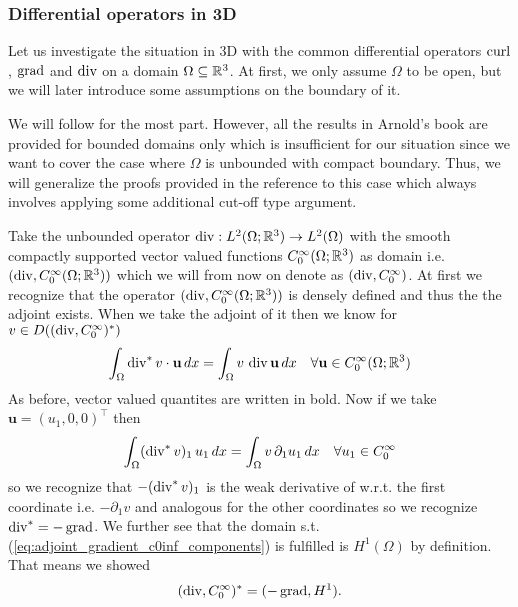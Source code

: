 \documentclass[../master_thesis.tex]{subfiles}
\begin{document}
\subsubsection{Differential operators in 3D}\label{sec:adjoints_differential_operators_3d}

Let us investigate the situation in 3D with the common differential 
operators $\operatorname{curl}$, $\operatorname{grad}$ and $\operatorname{div}$ on a domain $\Omega \subseteq \mathbb{R}^3$. 
At first, we only assume  $\Omega$ to be open, but we will later 
introduce some assumptions on the boundary of it. 


We will follow \cite[Sec.\,3.4]{arnold} for the most part. However, all the results in Arnold's book 
are provided for bounded domains only which is insufficient for our situation since 
we want to cover the case where $\Omega$ is unbounded with compact boundary. Thus, 
we will generalize the proofs provided in the reference to this case which always involves 
applying some additional cut-off type argument.

Take the unbounded operator 
$\operatorname{div}: L^2(\Omega;\mathbb{R}^3) \rightarrow L^2(\Omega)$ with the smooth compactly supported 
vector valued functions
$C_0^\infty(\Omega;\mathbb{R}^3)$ as domain i.e. $(\operatorname{div}, C_0^\infty(\Omega;\mathbb{R}^3))$ which 
we will from now on denote as $(\operatorname{div}, C_0^\infty)$. At first we recognize that 
the operator $(\operatorname{div}, C_0^\infty(\Omega;\mathbb{R}^3))$ is densely defined and thus the the adjoint exists.
When we take the adjoint of it then we know for $v \in 
D((\operatorname{div}, C_0^\infty)^*)$
\begin{align*}
    \int_\Omega \operatorname{div} ^* v \cdot \mathbf{u} \, dx
    = \int_\Omega v \, \operatorname{div} \mathbf{u} \, dx \quad \forall 
    \mathbf{u} \in C_0^\infty(\Omega;\mathbb{R}^3)
\end{align*}
As before, vector valued quantites are written in bold.
Now if we take $\mathbf{u} = (u_1,0,0)^\top$ then 
\begin{align}
    \int_\Omega (\operatorname{div} ^* v)_1 \, u_1 \, dx
    = \int_\Omega v \, \partial_1 u_1 \, dx \quad 
        \forall u_1 \in C_0^\infty \label{eq:adjoint_gradient_c0inf_components}
\end{align}
so we recognize that $-(\operatorname{div} ^* v)_1$ is the weak derivative of w.r.t. the 
first coordinate i.e. $-\partial_1 v$ and analogous for the other coordinates 
so we recognize $\operatorname{div}^* = -\operatorname{grad}$. We further see that the
domain s.t. (\ref{eq:adjoint_gradient_c0inf_components}) is fulfilled is $H^1(\Omega)$ 
by definition. That means we showed 
\begin{align}
    (\operatorname{div}, C_0^\infty)^* = (-\operatorname{grad}, H^1). \label{eq:adjoint_gradient_c0inf} 
\end{align}
\end{document}
